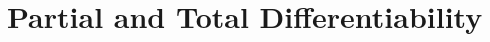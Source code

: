 \documentclass[../../script.tex]{subfiles}
\begin{document}
\section{Partial and Total Differentiability}

\begin{defi}

\end{defi}
\end{document}
